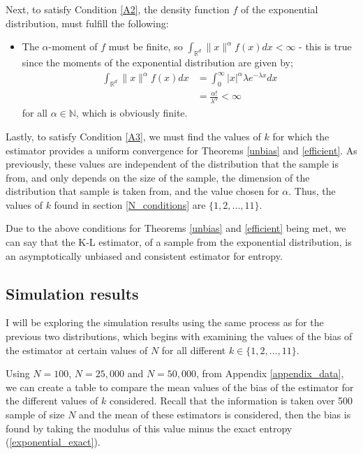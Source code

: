 \documentclass[12pt]{report}
\begin{document}
Next, to satisfy Condition \ref{A2}, the density function $f$ of the exponential distribution, must fulfill the following:
\begin{itemize}
\item The $\alpha$-moment of $f$ must be finite, so $\int_{\mathbb{R}^{d}} \| x \|^{\alpha} f(x) dx < \infty$ - this is true since the moments of the exponential distribution are given by;
\begin{align*}
\int_{\mathbb{R}^{d}} \| x \|^{\alpha} f(x) dx &= \int_{0}^{\infty} | x |^{\alpha} \lambda e^{-\lambda x} dx\\
&= \frac{\alpha !}{\lambda ^{\alpha}} < \infty
\end{align*}
for all $\alpha \in \mathbb{N}$, which is obviously finite.
\end{itemize}

Lastly, to satisfy Condition \ref{A3}, we must find the values of $k$ for which the estimator provides a uniform convergence for Theorems \ref{unbias} and \ref{efficient}. As previously, these values are independent of the distribution that the sample is from, and only depends on the size of the sample, the dimension of the distribution that sample is taken from, and the value chosen for $\alpha$. Thus, the values of $k$ found in section \ref{N_conditions} are $\{1, 2, ..., 11\}$.

Due to the above conditions for Theorems \ref{unbias} and \ref{efficient} being met, we can say that the K-L estimator, of a sample from the exponential distribution, is an asymptotically unbiased and consistent estimator for entropy. 



\subsection{Simulation results} \label{Expo_results}

I will be exploring the simulation results using the same process as for the previous two distributions, which begins with examining the values of the bias of the estimator at certain values of $N$ for all different $k \in \{1, 2, ..., 11\}$.

Using $N=100$, $N=25,000$ and $N=50,000$, from Appendix \ref{appendix_data}, we can create a table to compare the mean values of the bias of the estimator for the different values of $k$ considered. Recall that the information is taken over 500 sample of size $N$ and the mean of these estimators is considered, then the bias is found by taking the modulus of this value minus the exact entropy (\ref{exponential_exact}).
\end{document}
